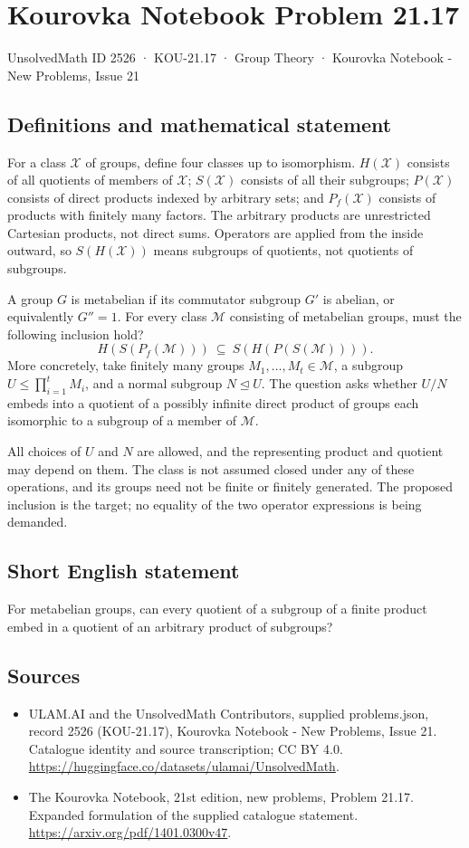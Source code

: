 \documentclass[11pt,a4paper]{article}
\begin{document}
\section*{Kourovka Notebook Problem 21.17}\label{2526}
{\small UnsolvedMath ID 2526 · KOU-21.17 · Group Theory · Kourovka Notebook - New Problems, Issue 21}
\subsection{Definitions and mathematical statement}
For a class $\mathcal X$ of groups, define four classes up to isomorphism.
$H(\mathcal X)$ consists of all quotients of members of $\mathcal X$;
$S(\mathcal X)$ consists of all their subgroups; $P(\mathcal X)$ consists
of direct products indexed by arbitrary sets; and $P_f(\mathcal X)$
consists of products with finitely many factors. The arbitrary products
are unrestricted Cartesian products, not direct sums. Operators are
applied from the inside outward, so $S(H(\mathcal X))$ means subgroups
of quotients, not quotients of subgroups.

A group $G$ is metabelian if its commutator subgroup $G'$ is abelian,
or equivalently $G''=1$. For every class $\mathcal M$ consisting of
metabelian groups, must the following inclusion hold?
\[
 H(S(P_f(\mathcal M)))\ \subseteq\ S(H(P(S(\mathcal M)))).
\]
More concretely, take finitely many groups $M_1,\ldots,M_t\in\mathcal M$,
a subgroup $U\le\prod_{i=1}^tM_i$, and a normal subgroup $N\trianglelefteq U$.
The question asks whether $U/N$ embeds into a quotient of a possibly
infinite direct product of groups each isomorphic to a subgroup of a
member of $\mathcal M$.

All choices of $U$ and $N$ are allowed, and the representing product
and quotient may depend on them. The class is not assumed closed under
any of these operations, and its groups need not be finite or finitely
generated. The proposed inclusion is the target; no equality of the
two operator expressions is being demanded.
\subsection{Short English statement}
For metabelian groups, can every quotient of a subgroup of a finite product embed in a quotient of an arbitrary product of subgroups?
\subsection{Sources}
\begin{itemize}
\item[S1] ULAM.AI and the UnsolvedMath Contributors, supplied problems.json, record 2526 (KOU-21.17), Kourovka Notebook - New Problems, Issue 21. Catalogue identity and source transcription; CC BY 4.0.
\url{https://huggingface.co/datasets/ulamai/UnsolvedMath}.
\item[S2] The Kourovka Notebook, 21st edition, new problems, Problem 21.17. Expanded formulation of the supplied catalogue statement.
\url{https://arxiv.org/pdf/1401.0300v47}.
\end{itemize}
\end{document}
